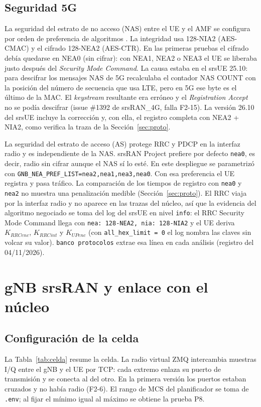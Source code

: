 \documentclass[conference]{IEEEtran}
\begin{document}
\subsection{Seguridad 5G}
La seguridad del estrato de no acceso (NAS) entre el UE y el AMF se configura por orden de preferencia de algoritmos \cite{ts33501}. La integridad usa 128-NIA2 (AES-CMAC) y el cifrado 128-NEA2 (AES-CTR). En las primeras pruebas el cifrado debía quedarse en NEA0 (sin cifrar): con NEA1, NEA2 o NEA3 el UE se liberaba justo después del \textit{Security Mode Command}. La causa estaba en el srsUE 25.10: para descifrar los mensajes NAS de 5G recalculaba el contador NAS COUNT con la posición del número de secuencia que usa LTE, pero en 5G ese byte es el último de la MAC. El \textit{keystream} resultante era erróneo y el \textit{Registration Accept} no se podía descifrar (issue \#1392 de srsRAN\_4G, falla F2-15). La versión 26.10 del srsUE \cite{srsran4g} incluye la corrección y, con ella, el registro completa con NEA2 + NIA2, como verifica la traza de la Sección~\ref{sec:proto}.

La seguridad del estrato de acceso (AS) protege RRC y PDCP en la interfaz radio y es independiente de la NAS. srsRAN Project prefiere por defecto \texttt{nea0}, es decir, radio sin cifrar aunque el NAS sí lo esté. En este despliegue se parametrizó con \texttt{GNB\_NEA\_PREF\_LIST=nea2,nea1,nea3,nea0}. Con esa preferencia el UE registra y pasa tráfico. La comparación de los tiempos de registro con \texttt{nea0} y \texttt{nea2} no muestra una penalización medible (Sección~\ref{sec:proto}). El RRC viaja por la interfaz radio y no aparece en las trazas del núcleo, así que la evidencia del algoritmo negociado se toma del log del srsUE en nivel \texttt{info}: el RRC Security Mode Command llega con \texttt{nea: 128-NEA2, nia: 128-NIA2} y el UE deriva $K_{RRCenc}$, $K_{RRCint}$ y $K_{UPenc}$ (con \texttt{all\_hex\_limit = 0} el log nombra las claves sin volcar su valor). \texttt{banco protocolos} extrae esa línea en cada análisis (registro del 04/11/2026).

\section{gNB srsRAN y enlace con el núcleo}
\label{sec:gnb}

\subsection{Configuración de la celda}
La Tabla~\ref{tab:celda} resume la celda. La radio virtual ZMQ intercambia muestras I/Q entre el gNB y el UE por TCP: cada extremo enlaza su puerto de transmisión y se conecta al del otro. En la primera versión los puertos estaban cruzados y no había radio (F2-6). El rango de MCS del planificador se toma de \texttt{.env}; al fijar el mínimo igual al máximo se obtiene la prueba P8.
\end{document}
